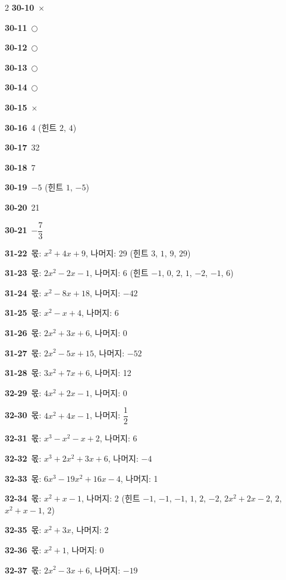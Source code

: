 \documentclass[10pt,a4paper]{article}
\begin{document}
\begin{multicols}{2}
\noindent\textbf{30-10}\ $\times$\par
\noindent\textbf{30-11}\ $\bigcirc$\par
\noindent\textbf{30-12}\ $\bigcirc$\par
\noindent\textbf{30-13}\ $\bigcirc$\par
\noindent\textbf{30-14}\ $\bigcirc$\par
\noindent\textbf{30-15}\ $\times$\par
\noindent\textbf{30-16}\ 4 (힌트 $2$, $4$)\par
\noindent\textbf{30-17}\ 32\par
\noindent\textbf{30-18}\ 7\par
\noindent\textbf{30-19}\ $-5$ (힌트 $1$, $-5$)\par
\noindent\textbf{30-20}\ 21\par
\noindent\textbf{30-21}\ $-\dfrac{7}{3}$\par
\noindent\textbf{31-22}\ 몫: $x^2+4x+9$, 나머지: 29 (힌트 $3$, $1$, $9$, $29$)\par
\noindent\textbf{31-23}\ 몫: $2x^2-2x-1$, 나머지: 6 (힌트 $-1$, $0$, $2$, $1$, $-2$, $-1$, $6$)\par
\noindent\textbf{31-24}\ 몫: $x^2-8x+18$, 나머지: $-42$\par
\noindent\textbf{31-25}\ 몫: $x^2-x+4$, 나머지: 6\par
\noindent\textbf{31-26}\ 몫: $2x^2+3x+6$, 나머지: 0\par
\noindent\textbf{31-27}\ 몫: $2x^2-5x+15$, 나머지: $-52$\par
\noindent\textbf{31-28}\ 몫: $3x^2+7x+6$, 나머지: 12\par
\noindent\textbf{32-29}\ 몫: $4x^2+2x-1$, 나머지: 0\par
\noindent\textbf{32-30}\ 몫: $4x^2+4x-1$, 나머지: $\dfrac{1}{2}$\par
\noindent\textbf{32-31}\ 몫: $x^3-x^2-x+2$, 나머지: 6\par
\noindent\textbf{32-32}\ 몫: $x^3+2x^2+3x+6$, 나머지: $-4$\par
\noindent\textbf{32-33}\ 몫: $6x^3-19x^2+16x-4$, 나머지: 1\par
\noindent\textbf{32-34}\ 몫: $x^2+x-1$, 나머지: 2 (힌트 $-1$, $-1$, $-1$, $1$, $2$, $-2$, $2x^2+2x-2$, $2$, $x^2+x-1$, $2$)\par
\noindent\textbf{32-35}\ 몫: $x^2+3x$, 나머지: 2\par
\noindent\textbf{32-36}\ 몫: $x^2+1$, 나머지: 0\par
\noindent\textbf{32-37}\ 몫: $2x^2-3x+6$, 나머지: $-19$\par

\end{multicols}
\end{document}
